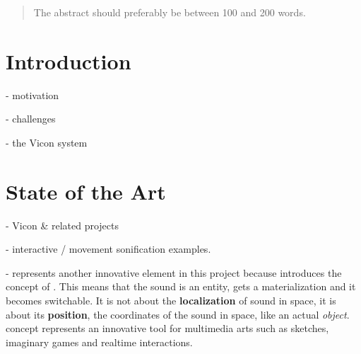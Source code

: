 \documentclass{nime-alternate}
\begin{document}
\date{20 Jan 2017}

\maketitle
\begin{abstract}

The abstract should preferably be between 100 and 200 words.
\end{abstract}






\section{Introduction}

- motivation

- challenges

- the Vicon system

\section{State of the Art}

- Vicon \& related projects

- interactive / movement sonification examples\cite{hermann2011sonification}.

-  represents another innovative element in this project because introduces the concept of . This means that the sound is an entity, gets a materialization and it becomes switchable. It is not about the \textbf{localization} of sound in space, it is about its \textbf{position}, the coordinates of the sound in space, like an actual \textit{object}.  concept represents an innovative tool for multimedia arts such as sketches, imaginary games and realtime interactions.
\end{document}
